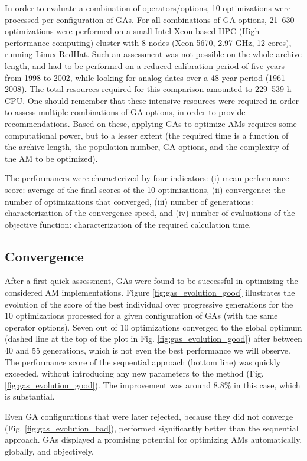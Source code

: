 \documentclass{ametsoc}
\begin{document}
In order to evaluate a combination of operators/options, 10 optimizations were processed per configuration of GAs. For all combinations of GA options, 21~630 optimizations were performed on a small Intel Xeon based HPC (High-performance computing) cluster with 8 nodes (Xeon 5670, 2.97 GHz, 12 cores), running Linux RedHat. Such an assessment was not possible on the whole archive length, and had to be performed on a reduced calibration period of five years from 1998 to 2002, while looking for analog dates over a 48 year period (1961-2008). The total resources required for this comparison amounted to 229~539 h CPU. One should remember that these intensive resources were required in order to assess multiple combinations of GA options, in order to provide recommendations. Based on these, applying GAs to optimize AMs requires some computational power, but to a lesser extent (the required time is a function of the archive length, the population number, GA options, and the complexity of the AM to be optimized). 

The performances were characterized by four indicators: (i) mean performance score: average of the final scores of the 10 optimizations, (ii) convergence: the number of optimizations that converged, (iii) number of generations: characterization of the convergence speed, and (iv) number of evaluations of the objective function: characterization of the required calculation time.


\subsection{Convergence}

After a first quick assessment, GAs were found to be successful in optimizing the considered AM implementations. Figure \ref{fig:gas_evolution_good} illustrates the evolution of the score of the best individual over progressive generations for the 10 optimizations processed for a given configuration of GAs (with the same operator options). Seven out of 10 optimizations converged to the global optimum (dashed line at the top of the plot in Fig. \ref{fig:gas_evolution_good}) after between 40 and 55 generations, which is not even the best performance we will observe. The performance score of the sequential approach (bottom line) was quickly exceeded, without introducing any new parameters to the method (Fig. \ref{fig:gas_evolution_good}). The improvement was around 8.8\% in this case, which is substantial.

Even GA configurations that were later rejected, because they did not converge (Fig. \ref{fig:gas_evolution_bad}), performed significantly better than the sequential approach. GAs displayed a promising potential for optimizing AMs automatically, globally, and objectively.
\end{document}
